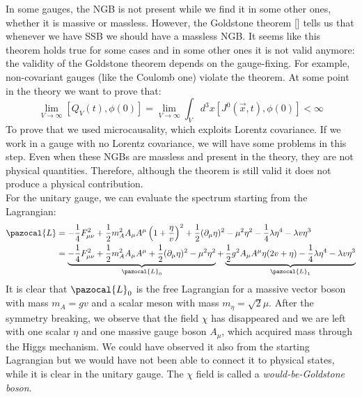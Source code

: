 \documentclass[../main.tex]{subfiles}
\begin{document}
In some gauges, the NGB is not present while we find it in some other ones, whether it is massive or massless. However, the Goldstone theorem [] tells us that whenever we have SSB we should have a massless NGB. It seems like this theorem holds true for some cases and in some other ones it is not valid anymore: the validity of the Goldstone theorem depends on the gauge-fixing. For example, non-covariant gauges (like the Coulomb one) violate the theorem. At some point in the theory we want to prove that:
\[
\lim_{V\to\infty}[Q_V(t),\phi(0)]=\lim_{V\to\infty}\int_Vd^3x[J^0(\Vec{x},t),\phi(0)]<\infty
\]
To prove that we used microcausality, which exploits Lorentz covariance. If we work in a gauge with no Lorentz covariance, we will have some problems in this step. Even when these NGBs are massless and present in the theory, they are not physical quantities. Therefore, although the theorem is still valid it does not produce a physical contribution.\\
For the unitary gauge, we can evaluate the spectrum starting from the Lagrangian:
\begin{align*}
\pazocal{L}&=-\frac{1}{4}F_{\mu\nu}^2+\frac{1}{2}m_A^2A_\mu A^\mu\left(1+\frac{\eta}{v}\right)^2+\frac{1}{2}(\partial_\mu\eta)^2-\mu^2\eta^2-\frac{1}{4}\lambda\eta^4-\lambda v\eta^3\\
&=\underbrace{-\frac{1}{4}F_{\mu\nu}^2+\frac{1}{2}m_A^2A_\mu A^\mu+\frac{1}{2}(\partial_\mu\eta)^2-\mu^2\eta^2}_{\pazocal{L}_0}+\underbrace{\frac{1}{2}g^2A_\mu A^\mu\eta(2v+\eta)-\frac{1}{4}\lambda\eta^4-\lambda v\eta^3}_{\pazocal{L}_1}
\end{align*}
It is clear that $\pazocal{L}_0$ is the free Lagrangian for a massive vector boson with mass $m_A=gv$ and a scalar meson with mass $m_\eta=\sqrt{2}\mu$. After the symmetry breaking, we observe that the field $\chi$ has disappeared and we are left with one scalar $\eta$ and one massive gauge boson $A_\mu$, which acquired mass through the Higgs mechanism. We could have observed it also from the starting Lagrangian but we would have not been able to connect it to physical states, while it is clear in the unitary gauge. The $\chi$ field is called a \textit{would-be-Goldstone boson}.
\end{document}
